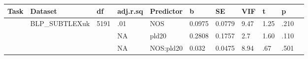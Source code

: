 \begin{table}[ht]
\centering
\begingroup\normalsize
\begin{tabular}{lllllllllll}
  \hline
Task & Dataset & df & adj.r.sq & Predictor & b & SE & VIF & t & p &  \\ 
  \hline
 & BLP\_SUBTLEXuk & 5191 & .01 & NOS & 0.0975 & 0.0779 & 9.47 & 1.25 & .210 &   \\ 
   &  &  & NA & pld20 & 0.2808 & 0.1757 & 2.7 & 1.60 & .110 &   \\ 
   &  &  & NA & NOS:pld20 & 0.032 & 0.0475 & 8.94 & .67 & .501 &   \\ 
   \hline
\end{tabular}
\endgroup
\end{table}
